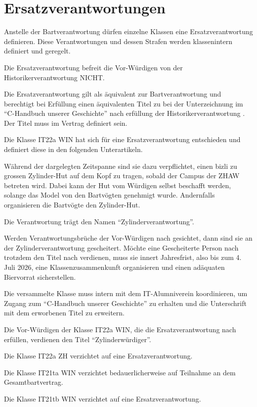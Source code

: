 \documentclass[fontsize=12pt,parskip=half]{scrartcl}
\begin{document}
\section{Ersatzverantwortungen}
\begin{contract}
  \Clause[title={Ersatzverantwortung}]\label{ersatz}
  Anstelle der Bartverantwortung dürfen einzelne Klassen eine Ersatzverantwortung definieren. Diese Verantwortungen und dessen Strafen werden klassenintern
  definiert und geregelt.

  Die Ersatzverantwortung befreit die Vor-Würdigen von der Historikerverantwortung  NICHT.

  Die Ersatzverantwortung gilt als äquivalent zur Bartverantwortung und berechtigt bei Erfüllung einen äquivalenten Titel zu  bei der Unterzeichnung
  im ``C-Handbuch unserer Geschichte'' nach erfüllung der Historikerverantwortung . Der Titel muss im Vertrag definiert sein.

  \Clause[title={Klasse IT22a WIN}]
  Die Klasse IT22a WIN hat sich für eine Ersatzverantwortung entschieden und definiert diese in den folgenden Unterartikeln.

  \SubClause[title={Ersatzverantwortung}]\label{KlasseIT22aWIN.ersatz}
  Während der  dargelegten Zeitspanne sind sie dazu verpflichtet, einen bizli zu grossen Zylinder-Hut auf dem Kopf zu tragen,
  sobald der Campus der ZHAW betreten wird. Dabei kann der Hut vom Würdigen selbst beschafft werden, solange das Model von den Bartvögten
  genehmigt wurde. Andernfalls organisieren die Bartvögte den Zylinder-Hut.

  Die Verantwortung trägt den Namen ``Zylinderverantwortung''.\label{KlasseIT22aWIN.verantwortung.name}

  \SubClause[title={Verstoss}]
  Werden Verantwortungsbrüche der Vor-Würdigen nach  gesichtet, dann sind sie an der Zylinderverantwortung
   gescheitert. Möchte eine Gescheiterte Person nach  trotzdem den Titel nach
   verdienen, muss sie innert Jahresfrist, also bis zum 4. Juli 2026, eine Klassenzusammenkunft organisieren
  und einen adäquaten Biervorrat sicherstellen.

  Die versammelte Klasse muss intern mit dem IT-Alumniverein koordinieren, um Zugang zum ``C-Handbuch unserer Geschichte'' zu erhalten und die Unterschrift
  mit dem erworbenen Titel zu erweitern.

  \SubClause[title={Titel}]\label{KlasseIT22aWIN.titel}
  Die Vor-Würdigen der Klasse IT22a WIN, die die Ersatzverantwortung nach  erfüllen, verdienen den Titel ``Zylinderwürdiger''.

  \Clause[title={Klasse IT22a ZH}]
  Die Klasse IT22a ZH verzichtet auf eine Ersatzverantwortung.

  \Clause[title={Klasse IT21ta WIN}]
  Die Klasse IT21ta WIN verzichtet bedauerlicherweise auf Teilnahme an dem Gesamtbartvertrag.

  \Clause[title={Klasse IT21tb WIN}]
  Die Klasse IT21tb WIN verzichtet auf eine Ersatzverantwortung.
\end{contract}
\end{document}
